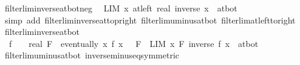 \begin{isabellebody}
\isadelimproof
\isanewline
%
\endisadelimproof
\isanewline
{}\isamarkupfalse%
\ filterlim{\isacharunderscore}{\kern0pt}inverse{\isacharunderscore}{\kern0pt}at{\isacharunderscore}{\kern0pt}bot{\isacharunderscore}{\kern0pt}neg{\isacharcolon}{\kern0pt}\isanewline
\ \ {\isachardoublequoteopen}LIM\ x\ {\isacharparenleft}{\kern0pt}at{\isacharunderscore}{\kern0pt}left\ {\isacharparenleft}{\kern0pt}{}{\isacharcolon}{\kern0pt}{\isacharcolon}{\kern0pt}real{\isacharparenright}{\kern0pt}{\isacharparenright}{\kern0pt}{\isachardot}{\kern0pt}\ inverse\ x\ {\isacharcolon}{\kern0pt}{\isachargreater}{\kern0pt}\ at{\isacharunderscore}{\kern0pt}bot{\isachardoublequoteclose}\isanewline
%
\isadelimproof
\ \ %
\endisadelimproof
%
\isatagproof
{}\isamarkupfalse%
\ {\isacharparenleft}{\kern0pt}simp\ add{\isacharcolon}{\kern0pt}\ filterlim{\isacharunderscore}{\kern0pt}inverse{\isacharunderscore}{\kern0pt}at{\isacharunderscore}{\kern0pt}top{\isacharunderscore}{\kern0pt}right\ filterlim{\isacharunderscore}{\kern0pt}uminus{\isacharunderscore}{\kern0pt}at{\isacharunderscore}{\kern0pt}bot\ filterlim{\isacharunderscore}{\kern0pt}at{\isacharunderscore}{\kern0pt}left{\isacharunderscore}{\kern0pt}to{\isacharunderscore}{\kern0pt}right{\isacharparenright}{\kern0pt}%
\endisatagproof
{\isafoldproof}%
%
\isadelimproof
\isanewline
%
\endisadelimproof
\isanewline
{}\isamarkupfalse%
\ filterlim{\isacharunderscore}{\kern0pt}inverse{\isacharunderscore}{\kern0pt}at{\isacharunderscore}{\kern0pt}bot{\isacharcolon}{\kern0pt}\isanewline
\ \ {\isachardoublequoteopen}{\isacharparenleft}{\kern0pt}f\ {\isasymlonglongrightarrow}\ {\isacharparenleft}{\kern0pt}{}\ {\isacharcolon}{\kern0pt}{\isacharcolon}{\kern0pt}\ real{\isacharparenright}{\kern0pt}{\isacharparenright}{\kern0pt}\ F\ {\isasymLongrightarrow}\ eventually\ {\isacharparenleft}{\kern0pt}{\isasymlambda}x{\isachardot}{\kern0pt}\ f\ x\ {\isacharless}{\kern0pt}\ {}{\isacharparenright}{\kern0pt}\ F\ {\isasymLongrightarrow}\ LIM\ x\ F{\isachardot}{\kern0pt}\ inverse\ {\isacharparenleft}{\kern0pt}f\ x{\isacharparenright}{\kern0pt}\ {\isacharcolon}{\kern0pt}{\isachargreater}{\kern0pt}\ at{\isacharunderscore}{\kern0pt}bot{\isachardoublequoteclose}\isanewline
%
\isadelimproof
\ \ %
\endisadelimproof
%
\isatagproof
{}\isamarkupfalse%
\ filterlim{\isacharunderscore}{\kern0pt}uminus{\isacharunderscore}{\kern0pt}at{\isacharunderscore}{\kern0pt}bot\ inverse{\isacharunderscore}{\kern0pt}minus{\isacharunderscore}{\kern0pt}eq{\isacharbrackleft}{\kern0pt}symmetric{\isacharbrackright}{\kern0pt}\isanewline

\end{isabellebody}
